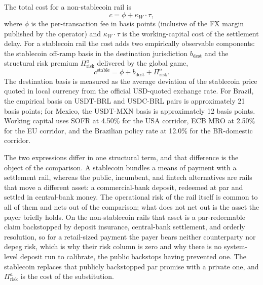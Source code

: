 The total cost for a non-stablecoin rail is
\begin{equation}\label{eq:total_cost_nonstable}
c = \phi + \kappa_W \cdot \tau,
\end{equation}
where $\phi$ is the per-transaction fee in basis points (inclusive of the FX margin published by the operator) and $\kappa_W \cdot \tau$ is the working-capital cost of the settlement delay. For a stablecoin rail the cost adds two empirically observable components: the stablecoin off-ramp basis in the destination jurisdiction $b_{\text{dest}}$ and the structural risk premium $\Pi_{\text{risk}}^{a}$ delivered by the global game,
\begin{equation}\label{eq:total_cost_stable}
c^{\text{stable}} = \phi + b_{\text{dest}} + \Pi_{\text{risk}}^{a}.
\end{equation}
The destination basis is measured as the average deviation of the stablecoin price quoted in local currency from the official USD-quoted exchange rate. For Brazil, the empirical basis on USDT-BRL and USDC-BRL pairs is approximately 21 basis points; for Mexico, the USDT-MXN basis is approximately 12 basis points. Working capital uses SOFR at 4.50\% for the USA corridor, ECB MRO at 2.50\% for the EU corridor, and the Brazilian policy rate at 12.0\% for the BR-domestic corridor.

The two expressions differ in one structural term, and that difference is the object of the comparison. A stablecoin bundles a means of payment with a settlement rail, whereas the public, incumbent, and fintech alternatives are rails that move a different asset: a commercial-bank deposit, redeemed at par and settled in central-bank money. The operational risk of the rail itself is common to all of them and nets out of the comparison; what does not net out is the asset the payer briefly holds. On the non-stablecoin rails that asset is a par-redeemable claim backstopped by deposit insurance, central-bank settlement, and orderly resolution, so for a retail-sized payment the payer bears neither counterparty nor depeg risk, which is why their risk column is zero and why there is no system-level deposit run to calibrate, the public backstops having prevented one. The stablecoin replaces that publicly backstopped par promise with a private one, and $\Pi_{\text{risk}}^{a}$ is the cost of the substitution.

